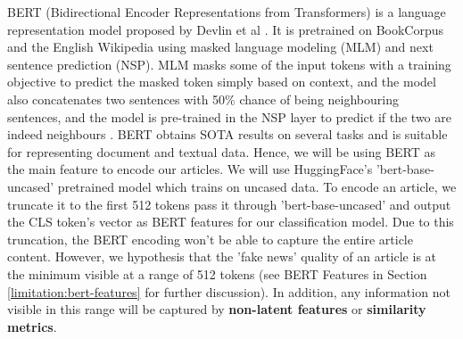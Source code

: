\documentclass{article}
\begin{document}
\begin{table}
  \begin{center}
  \end{center}
  \caption{Examples of preprocessing and tokenization extraction on items in dataset.}
  \label{preprocessing}
\end{table}

\label{section:bert}
BERT (Bidirectional Encoder Representations from Transformers) is a language representation model proposed by Devlin et al \cite{bert}. It is pretrained on BookCorpus and the English Wikipedia using masked language modeling (MLM) and next sentence prediction (NSP). MLM masks some of the input tokens with a training objective to predict the masked token simply based on context, and the model also concatenates two sentences with 50\% chance of being neighbouring sentences, and the model is pre-trained in the NSP layer to predict if the two are indeed neighbours \cite{bert}. BERT obtains SOTA results on several tasks and is suitable for representing document and textual data. Hence, we will be using BERT as the main feature to encode our articles. We will use HuggingFace's 'bert-base-uncased' pretrained model which trains on uncased data. To encode an article, we truncate it to the first 512 tokens pass it through 'bert-base-uncased' and output the CLS token's vector as BERT features for our classification model. Due to this truncation, the BERT encoding won't be able to capture the entire article content. However, we hypothesis that the 'fake news' quality of an article is at the minimum visible at a range of 512 tokens (see BERT Features in Section \ref{limitation:bert-features} for further discussion). In addition, any information not visible in this range will be captured by \textbf{non-latent features} or \textbf{similarity metrics}.
\end{document}
